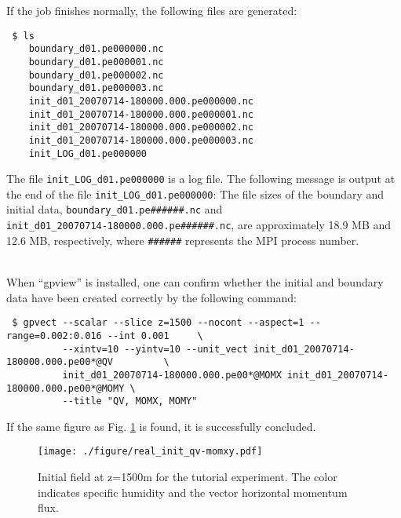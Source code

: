 If the job finishes normally, the following files are generated:
\begin{verbatim}
 $ ls
    boundary_d01.pe000000.nc
    boundary_d01.pe000001.nc
    boundary_d01.pe000002.nc
    boundary_d01.pe000003.nc
    init_d01_20070714-180000.000.pe000000.nc
    init_d01_20070714-180000.000.pe000001.nc
    init_d01_20070714-180000.000.pe000002.nc
    init_d01_20070714-180000.000.pe000003.nc
    init_LOG_d01.pe000000
\end{verbatim}
The file \verb|init_LOG_d01.pe000000| is a log file.  The following message is output at the end of the file \verb|init_LOG_d01.pe000000|:
The file sizes of the boundary and initial data, \verb|boundary_d01.pe######.nc| and \\
\verb|init_d01_20070714-180000.000.pe######.nc|, are approximately 18.9 MB and 12.6 MB, respectively,  where \verb|######| represents the MPI process number.

\vspace{1cm}
 \hrulefill \\
When ``gpview'' is installed,  one can confirm whether the initial and boundary data have been created correctly  by the following command:
\begin{verbatim}
 $ gpvect --scalar --slice z=1500 --nocont --aspect=1 --range=0.002:0.016 --int 0.001     \
          --xintv=10 --yintv=10 --unit_vect init_d01_20070714-180000.000.pe00*@QV         \
          init_d01_20070714-180000.000.pe00*@MOMX init_d01_20070714-180000.000.pe00*@MOMY \
          --title "QV, MOMX, MOMY"
\end{verbatim}
If the same figure as Fig. \ref{fig:init} is found, it is successfully concluded.

\begin{figure}[h]
\begin{center}
  \texttt{[image: ./figure/real\_init\_qv-momxy.pdf]}\\
  \caption{Initial field at z=1500m for the tutorial experiment.
    The color indicates specific humidity and the vector horizontal momentum flux.}
  \label{fig:init}
\end{center}
\end{figure}

